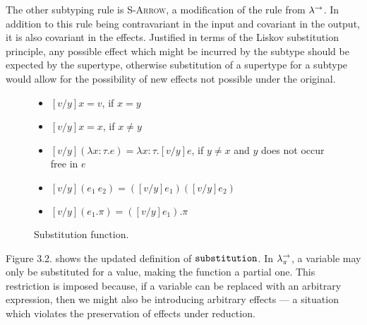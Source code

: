 The other subtyping rule is \textsc{S-Arrow}, a modification of the rule from $\lambda^{\rightarrow}$. In addition to this rule being contravariant in the input and covariant in the output, it is also covariant in the effects. Justified in terms of the Liskov substitution principle, any possible effect which might be incurred by the subtype should be expected by the supertype, otherwise substitution of a supertype for a subtype would allow for the possibility of new effects not possible under the original.\\

\begin{figure}[h]


\begin{itemize}
	\setlength\itemsep{-0.7em}
	\item[] $[v/y]x = v$, if $x = y$
	\item[] $[v/y]x = x$, if $x \neq y$
	\item[] $[v/y](\lambda x: \tau. e) = \lambda x: \tau.[v/y]e$, if $y \neq x$ and $y$ does not occur free in $e$
	\item[] $[v/y](e_1~e_2) = ([v/y]e_1)([v/y]e_2)$
	\item[] $[v/y](e_1.\pi) = ([v/y]e_1).\pi$
\end{itemize}

\vspace{-7pt}
\caption{Substitution function.}
\label{This is the label.}
\end{figure}

Figure 3.2. shows the updated definition of $\mathtt{substitution}$. In $\lambda^{\rightarrow}_{\pi}$, a variable may only be substituted for a value, making the function a partial one. This restriction is imposed because, if a variable can be replaced with an arbitrary expression, then we might also be introducing arbitrary effects --- a situation which violates the preservation of effects under reduction. \\

